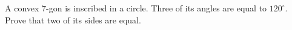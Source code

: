 A convex $7$-gon is inscribed in a circle. Three of its angles are equal to $120^\circ$. Prove that two of its sides are equal.
